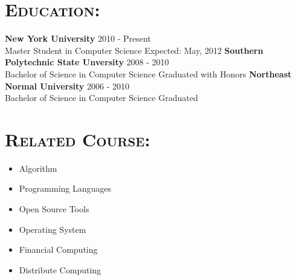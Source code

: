 \begin{resume}




\section{\textsc{Education:}}

\textbf{\newline New York University} \hfill 2010 - Present \\
\hspace*{0.2in}Master Student in Computer Science \hfill Expected: May, 2012
\newline
\textbf{Southern Polytechnic State Unversity} \hfill 2008 - 2010 \\ 
\hspace*{0.2in}Bachelor of Science in Computer Science \hfill Graduated with Honors
\newline
\textbf{Northeast Normal University} \hfill 2006 - 2010 \\
\hspace*{0.2in}Bachelor of Science in Computer Science \hfill Graduated


\section{\textsc{Related Course:}}

\begin{multicols}{2}
\begin{itemize}
    \item Algorithm
    \item Programming Languages
    \item Open Source Tools
    \item Operating System
    \item Financial Computing 
    \item Distribute Computing
\end{itemize}
\end{multicols}



\end{resume}
